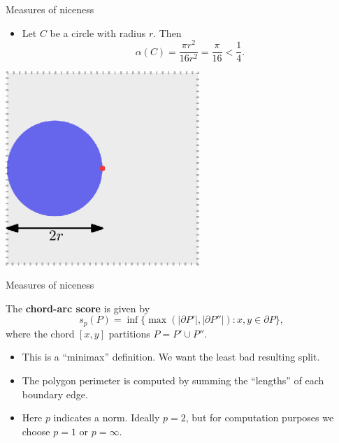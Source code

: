\documentclass[]{beamer}
\newcommand{\abs}[1]{|#1|}
\newcommand{\set}[1]{\{ #1 \}}
\newcommand{\defkey}{\textbf}
\begin{document}
\begin{frame}[t]{Measures of niceness}
  \begin{itemize}
    \item Let $C$ be a circle with radius $r$. Then 
      \begin{equation*}
        \alpha(C) = \frac{\pi r^2}{16r^2} = \frac{\pi}{16} < \frac{1}{4}.
      \end{equation*}
  \end{itemize}
  \begin{center}
    \includegraphics[width=0.55\textwidth]{../plots/alpha_fatness_circle.eps}
  \end{center}
\end{frame}


\begin{frame}[t]{Measures of niceness}
  \begin{definition}
    The \defkey{chord-arc score} is given by
    \begin{equation*}
      s_p (P) =
      \inf\set{\max( \abs{\partial P'}, \abs{\partial P''}): x,y \in \partial P},
    \end{equation*}
    where the chord $[x,y]$ partitions $P = P' \cup P''$.
  \end{definition}
  \begin{itemize}
    \item This is a ``minimax'' definition. We want the least bad resulting split.
    \item The polygon perimeter is computed by summing the ``lengths'' of each
      boundary edge.
    \item Here $p$ indicates a norm. Ideally $p = 2$, but for computation
      purposes we choose $p = 1$ or $p= \infty$.
  \end{itemize}
\end{frame}
\end{document}
